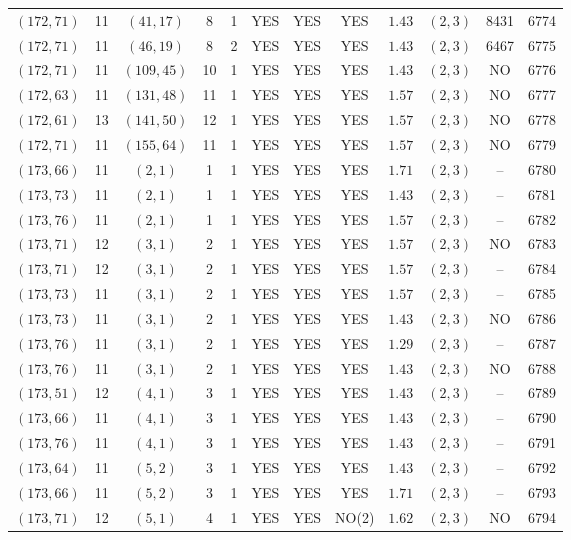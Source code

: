\begin{longtable}{|c|c|c|c|c|c|c|c|c|c|c|c|}
$(172,71)$ & 11 & $(41,17)$ & 8 & 1 & YES & YES & YES & $1.43$ & $(2,3)$ & 8431 & 6774\\
$(172,71)$ & 11 & $(46,19)$ & 8 & 2 & YES & YES & YES & $1.43$ & $(2,3)$ & 6467 & 6775\\
$(172,71)$ & 11 & $(109,45)$ & 10 & 1 & YES & YES & YES & $1.43$ & $(2,3)$ & NO & 6776\\
$(172,63)$ & 11 & $(131,48)$ & 11 & 1 & YES & YES & YES & $1.57$ & $(2,3)$ & NO & 6777\\
$(172,61)$ & 13 & $(141,50)$ & 12 & 1 & YES & YES & YES & $1.57$ & $(2,3)$ & NO & 6778\\
$(172,71)$ & 11 & $(155,64)$ & 11 & 1 & YES & YES & YES & $1.57$ & $(2,3)$ & NO & 6779\\
$(173,66)$ & 11 & $(2,1)$ & 1 & 1 & YES & YES & YES & $1.71$ & $(2,3)$ & -- & 6780\\
$(173,73)$ & 11 & $(2,1)$ & 1 & 1 & YES & YES & YES & $1.43$ & $(2,3)$ & -- & 6781\\
$(173,76)$ & 11 & $(2,1)$ & 1 & 1 & YES & YES & YES & $1.57$ & $(2,3)$ & -- & 6782\\
$(173,71)$ & 12 & $(3,1)$ & 2 & 1 & YES & YES & YES & $1.57$ & $(2,3)$ & NO & 6783\\
$(173,71)$ & 12 & $(3,1)$ & 2 & 1 & YES & YES & YES & $1.57$ & $(2,3)$ & -- & 6784\\
$(173,73)$ & 11 & $(3,1)$ & 2 & 1 & YES & YES & YES & $1.57$ & $(2,3)$ & -- & 6785\\
$(173,73)$ & 11 & $(3,1)$ & 2 & 1 & YES & YES & YES & $1.43$ & $(2,3)$ & NO & 6786\\
$(173,76)$ & 11 & $(3,1)$ & 2 & 1 & YES & YES & YES & $1.29$ & $(2,3)$ & -- & 6787\\
$(173,76)$ & 11 & $(3,1)$ & 2 & 1 & YES & YES & YES & $1.43$ & $(2,3)$ & NO & 6788\\
$(173,51)$ & 12 & $(4,1)$ & 3 & 1 & YES & YES & YES & $1.43$ & $(2,3)$ & -- & 6789\\
$(173,66)$ & 11 & $(4,1)$ & 3 & 1 & YES & YES & YES & $1.43$ & $(2,3)$ & -- & 6790\\
$(173,76)$ & 11 & $(4,1)$ & 3 & 1 & YES & YES & YES & $1.43$ & $(2,3)$ & -- & 6791\\
$(173,64)$ & 11 & $(5,2)$ & 3 & 1 & YES & YES & YES & $1.43$ & $(2,3)$ & -- & 6792\\
$(173,66)$ & 11 & $(5,2)$ & 3 & 1 & YES & YES & YES & $1.71$ & $(2,3)$ & -- & 6793\\
$(173,71)$ & 12 & $(5,1)$ & 4 & 1 & YES & YES & NO(2) & $1.62$ & $(2,3)$ & NO & 6794\\

\end{longtable}
